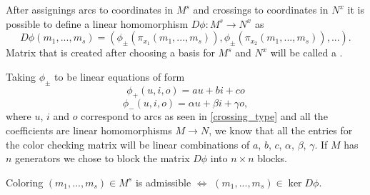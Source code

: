 %
%

\begin{definition}
  After assignings arcs to coordinates in $M^s$ and crossings to coordinates in $N^x$ it is possible to define a linear homomorphism $D\phi:M^s\to N^x$  as
  $$D\phi(m_1,...,m_s)=(\phi_\pm(\pi_{x_1}(m_1,...,m_s)), \phi_\pm(\pi_{x_2}(m_1,...,m_s)),...).$$
  Matrix that is created after choosing a basis for $M^s$ and $N^x$ will be called a .
\end{definition}

Taking $\phi_\pm$ to be linear equations of form
$$\phi_+(u,i,o)=au+bi+co$$
$$\phi_-(u,i,o)=\alpha u+\beta i+\gamma o,$$
where $u$, $i$ and $o$ correspond to arcs as seen in \cref{crossing_type} and all the coefficients are linear homomorphisms $M\to N$, we know that all the entries for the color checking matrix will be linear combinations of $a$, $b$, $c$, $\alpha$, $\beta$, $\gamma$. If $M$ has $n$ generators we chose to block the matrix $D\phi$ into $n\times n$ blocks.

\begin{proposition}
  Coloring $(m_1,...,m_s)\in M^s$ is admissible $\iff$ $(m_1,...,m_s)\in\ker D\phi$.
\end{proposition}

